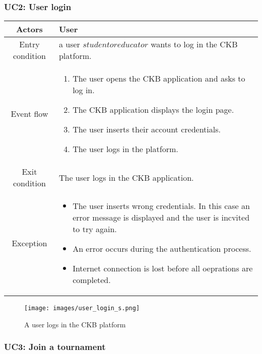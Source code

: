 \documentclass[a4paper, 11pt, titlepage]{article}
\begin{document}
\subsubsection*{UC2: User login}
\begin{center}
    \begin{tabularx}{\linewidth}{|c|X|}
    \hline
    Actors & User\\
    \hline
    Entry condition & a user \(student or educator\) wants to log in the CKB platform.\\
    \hline
    Event flow & \begin{enumerate}
        \item The user opens the CKB application and asks to log in.
        \item The CKB application displays the login page.
        \item The user inserts their account credentials.
        \item The user logs in the platform.
    \end{enumerate}\\
    \hline
    Exit condition & The user logs in the CKB application.\\
    \hline
    Exception & \begin{itemize}
        \item The user inserts wrong credentials. In this case an error message is displayed and the user is incvited to try again.
        \item An error occurs during the authentication process.
        \item Internet connection is lost before all oeprations are completed.
    \end{itemize} \\
    \hline
    \end{tabularx}
\end{center}

\begin{figure}[h!]
    \centering
    \texttt{[image: images/user\_login\_s.png]}
    \caption{A user logs in the CKB platform}
    \label{fig:seq_diag_user_login}
    
\end{figure}

\clearpage

\subsubsection*{UC3: Join a tournament}
\end{document}
